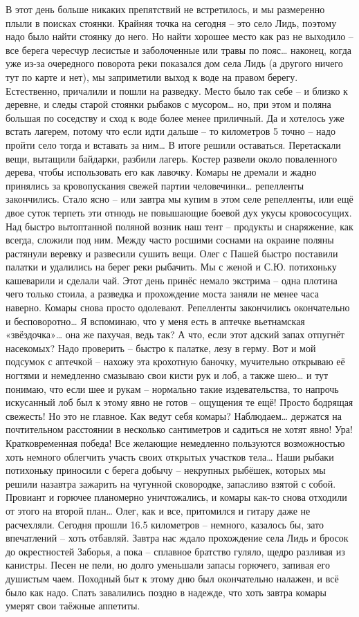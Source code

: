 В этот день больше никаких препятствий не встретилось, и мы размеренно плыли в поисках стоянки. Крайняя точка на сегодня – это село Лидь, поэтому надо было найти стоянку до него. Но найти хорошее место как раз не выходило – все берега чересчур лесистые и заболоченные или травы по пояс… наконец, когда уже из-за очередного поворота реки показался дом села Лидь (а другого ничего тут по карте и нет), мы заприметили выход к воде на правом берегу. Естественно, причалили и пошли на разведку. Место было так себе – и близко к деревне, и следы старой стоянки рыбаков с мусором… но, при этом и поляна большая по соседству и сход к воде более менее приличный. Да и хотелось уже встать лагерем, потому что если идти дальше – то километров 5 точно – надо пройти село тогда и вставать за ним…
В итоге решили оставаться. Перетаскали вещи, вытащили байдарки, разбили лагерь. Костер развели около поваленного дерева, чтобы использовать его как лавочку. Комары не дремали и жадно принялись за кровопускания свежей партии человечинки… репелленты закончились. Стало ясно – или завтра мы купим в этом селе репелленты, или ещё двое суток терпеть эти отнюдь не повышающие боевой дух укусы кровососущих.
Над быстро вытоптанной поляной возник наш тент – продукты и снаряжение, как всегда, сложили под ним. Между часто росшими соснами на окраине поляны растянули веревку и развесили сушить вещи. Олег с Пашей быстро поставили палатки и удалились на берег реки рыбачить. Мы с женой и С.Ю. потихоньку кашеварили и сделали чай. Этот день принёс немало экстрима – одна плотина чего только стоила, а разведка и прохождение моста заняли не менее часа наверно. 
Комары снова просто одолевают. Репелленты закончились окончательно и бесповоротно… Я вспоминаю, что у меня есть в аптечке вьетнамская «звёздочка»… она же пахучая, ведь так? А что, если этот адский запах отпугнёт насекомых? Надо проверить – быстро к палатке, лезу в герму. Вот и мой подсумок с аптечкой – нахожу эта крохотную баночку, мучительно открываю её ногтями и немедленно смазываю свои кисти рук и лоб, а также шею… и тут понимаю, что если шее и рукам – нормально такие издевательства, то напрочь искусанный лоб был к этому явно не готов – ощущения те ещё! Просто бодрящая свежесть! Но это не главное. Как ведут себя комары? Наблюдаем… держатся на почтительном расстоянии в несколько сантиметров и садиться не хотят явно! Ура! Кратковременная победа! Все желающие немедленно пользуются возможностью хоть немного облегчить участь своих открытых участков тела…
Наши рыбаки потихоньку приносили с берега добычу – некрупных рыбёшек, которых мы решили назавтра зажарить на чугунной сковородке, запасливо взятой с собой. Провиант и горючее планомерно уничтожались, и комары как-то снова отходили от этого на второй план… Олег, как и все, притомился и гитару даже не расчехляли.
Сегодня прошли 16.5 километров – немного, казалось бы, зато впечатлений – хоть отбавляй. Завтра нас ждало прохождение села Лидь и бросок до окрестностей Заборья, а пока – сплавное братство гуляло, щедро разливая из канистры. Песен не пели, но долго уменьшали запасы горючего, запивая его душистым чаем. Походный быт к этому дню был окончательно налажен, и всё было как надо. Спать завалились поздно в надежде, что хоть завтра комары умерят свои таёжные аппетиты.

\begin{center}
\end{center}

